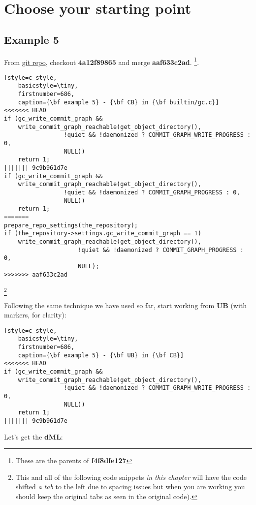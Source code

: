 
\section{Choose your starting point}

\subsection{Example 5}
\label{example_05}

From \hyperref[git_repo]{git repo}, checkout {\bf 4a12f89865} and merge {\bf aaf633c2ad}.
\footnote{These are the parents of {\bf f4f8dfe127}}.

\begin{lstlisting}[style=c_style,
	basicstyle=\tiny,
	firstnumber=686,
	caption={\bf example 5} - {\bf CB} in {\bf builtin/gc.c}]
<<<<<<< HEAD
if (gc_write_commit_graph &&
    write_commit_graph_reachable(get_object_directory(),
				 !quiet && !daemonized ? COMMIT_GRAPH_WRITE_PROGRESS : 0,
				 NULL))
	return 1;
||||||| 9c9b961d7e
if (gc_write_commit_graph &&
    write_commit_graph_reachable(get_object_directory(),
				 !quiet && !daemonized ? COMMIT_GRAPH_PROGRESS : 0,
				 NULL))
	return 1;
=======
prepare_repo_settings(the_repository);
if (the_repository->settings.gc_write_commit_graph == 1)
	write_commit_graph_reachable(get_object_directory(),
				     !quiet && !daemonized ? COMMIT_GRAPH_PROGRESS : 0,
				     NULL);
>>>>>>> aaf633c2ad
\end{lstlisting}\footnote{This and all of the following code snippets {\it in this chapter} will have
the code shifted {\it a tab} to the left due to spacing issues but when you are working you should
keep the original tabs as seen in the original code).}

Following the same technique we have used so far, start working from {\bf UB} (with markers, for clarity):

\begin{lstlisting}[style=c_style,
	basicstyle=\tiny,
	firstnumber=686,
	caption={\bf example 5} - {\bf UB} in {\bf CB}]
<<<<<<< HEAD
if (gc_write_commit_graph &&
    write_commit_graph_reachable(get_object_directory(),
				 !quiet && !daemonized ? COMMIT_GRAPH_WRITE_PROGRESS : 0,
				 NULL))
	return 1;
||||||| 9c9b961d7e
\end{lstlisting}

Let's get the {\bf dML}:

